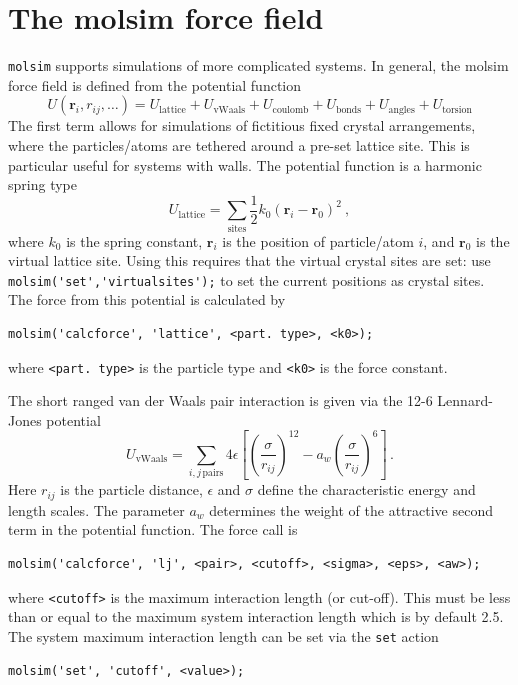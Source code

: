 \documentclass[11pt]{article}
\begin{document}
\section{The \textsf{molsim} force field}
\verb!molsim! supports simulations of more complicated systems. In general, the
\textsf{molsim} force field is defined from the potential function
\begin{equation}
  U(\mathbf{r}_i, r_{ij}, \ldots)
  =  U_\mathrm{lattice} + U_\mathrm{vWaals} + U_{\mathrm{coulomb}} +
  U_\mathrm{bonds} + U_\mathrm{angles} + 
  U_\mathrm{torsion}
\end{equation}
The first term allows for simulations of fictitious fixed crystal arrangements,
where the particles/atoms are tethered around a pre-set lattice site. This is
particular useful for systems with walls. The potential function is a harmonic
spring type
\begin{equation}
  U_\mathrm{lattice} =
  \sum_\mathrm{sites} \frac{1}{2}k_0 (\mathbf{r}_i - \mathbf{r}_0)^2 \ ,
\end{equation}
where $k_0$ is the spring constant, $\mathbf{r}_i$ is the position of
particle/atom $i$, and $\mathbf{r}_0$ is the virtual lattice site. Using this
requires that the virtual crystal sites are set: use
\verb!molsim('set','virtualsites');! to set the current positions as crystal
sites. The force from this potential is calculated by
\begin{verbatim}
molsim('calcforce', 'lattice', <part. type>, <k0>);
\end{verbatim}
where \verb!<part. type>! is the particle type and \verb!<k0>! is the force
constant. 

The short ranged van der Waals pair interaction is given via the 12-6 
Lennard-Jones potential
\begin{equation}
  U_\mathrm{vWaals} =  \sum_{i,j \, \mathrm{pairs}}
  4\epsilon\left[\left(\frac{\sigma}{r_{ij}}\right)^{12} - a_w
    \left(\frac{\sigma}{r_{ij}}\right)^{6}\right] \, .
\end{equation}
Here $r_{ij}$ is the particle distance, $\epsilon$ and $\sigma$ define the
characteristic energy and length scales. The parameter $a_w$ determines the
weight of the attractive second term in the potential function. The force call
is
\begin{verbatim}
molsim('calcforce', 'lj', <pair>, <cutoff>, <sigma>, <eps>, <aw>);
\end{verbatim}
where \verb!<cutoff>! is the maximum interaction length (or cut-off). This must
be less than or equal to the maximum system interaction length which is by
default 2.5. The system maximum interaction length can be set via the
\verb!set! action
\begin{verbatim}
molsim('set', 'cutoff', <value>);
\end{verbatim}
\end{document}
